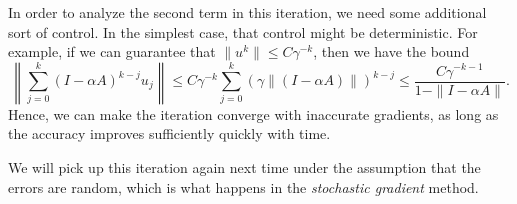\documentclass[12pt, leqno]{article} %
\begin{document}
In order to analyze the second term in this iteration, we need some
additional sort of control.  In the simplest case, that control might
be deterministic.  For example, if we can guarantee that
$\|u^k\| \leq C \gamma^{-k}$, then we have the bound
\[
  \left\| \sum_{j=0}^k  (I-\alpha A)^{k-j} u_j \right\| \leq
  C \gamma^{-k} \sum_{j=0}^k \left( \gamma \|(I-\alpha A)\|\right)^{k-j} \leq
  \frac{C \gamma^{-k-1}}{1-\|I-\alpha A\|}.
\]
Hence, we can make the iteration converge with inaccurate gradients,
as long as the accuracy improves sufficiently quickly with time.

We will pick up this iteration again next time under the assumption
that the errors are random, which is what happens in the
{\em stochastic gradient} method.
\end{document}
